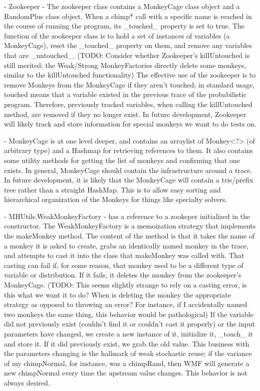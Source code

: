 - Zookeeper - The zookeeper class contains a MonkeyCage class object and a RandomPlus class object. When a chimp* call with a specific name is reached in the course of running the program, its _touched_ property is set to true. The function of the zookeeper class is to hold a set of instances of variables (a MonkeyCage), reset the _touched_ property on them, and remove any variables that are _untouched_. (TODO: Consider whether Zookeeper's killUntouched is still merited; the Weak/Strong MonkeyFactories directly delete some monkeys, similar to the killUntouched functionality) The effective use of the zookeeper is to remove Monkeys from the MonkeyCage if they aren't touched; in standard usage, touched means that a variable existed in the previous trace of the probabilistic program. Therefore, previously tracked variables, when calling the killUntouched method, are removed if they no longer exist.
In future development, Zookeeper will likely track and store information for special monkeys we want to do tests on.

- MonkeyCage is at one level deeper, and contains an arraylist of Monkey<?> (of arbitrary type) and a Hashmap for retrieving references to them. It also contains some utility methods for getting the list of monkeys and confirming that one exists. In general, MonkeyCage should contain the infrastructure around a trace. In future development, it is likely that the MonkeyCage will contain a trie/prefix tree rather than a straight HashMap. This is to allow easy sorting and hierarchical organization of the Monkeys for things like specialty solvers.

- MHUtils.WeakMonkeyFactory - has a reference to a zookeper initialized in the constructor. The WeakMonkeyFactory is a memoization strategy that implements the makeMonkey method. The content of the method is that it takes the name of a monkey it is asked to create, grabs an identically named monkey in the trace, and attempts to cast it into the class that makeMonkey was called with. That casting can fail if, for some reason, that monkey used to be a different type of variable or distribution. If it fails, it deletes the monkey from the zookeeper's MonkeyCage.
(TODO: This seems slightly strange to rely on a casting error, is this what we want it to do? When is deleting the monkey the appropriate strategy as opposed to throwing an error? For instance, if I accidentally named two monkeys the same thing, this behavior would be pathological)
If the variable did not previously exist (couldn't find it or couldn't cast it properly) or the input parameters have changed, we create a new instance of it, initialize it, _touch_ it and store it. If it did previously exist, we grab the old value. This business with the parameters changing is the hallmark of weak stochastic reuse; if the variance of my chimpNormal, for instance, was a chimpRand, then WMF will generate a new chimpNormal every time the upstream value changes. This behavior is not always desired.

